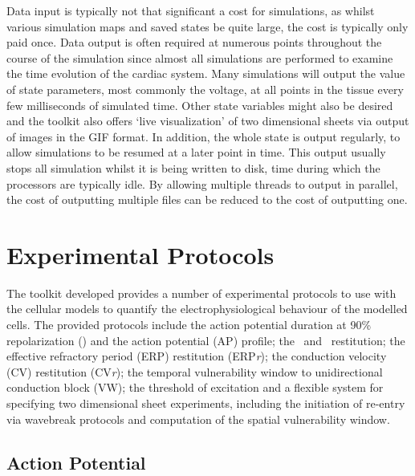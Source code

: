 Data input is typically not that significant a cost for
simulations, as whilst various simulation maps and saved states be quite large,
the cost is typically only paid once.  Data output is often required at numerous
points throughout the course of the simulation since almost all simulations are
performed to examine the time evolution of the cardiac system.  Many simulations
will output the value of state parameters, most commonly the voltage, at all
points in the tissue every few milliseconds of simulated time.  Other state
variables might also be desired and the toolkit also offers `live visualization'
of two dimensional sheets via output of images in the GIF format.  In addition,
the whole state is output regularly, to allow simulations to be resumed at a
later point in time.  This output usually stops all simulation whilst it is
being written to disk, time during which the processors are typically idle.  By
allowing multiple threads to output in parallel, the cost of outputting multiple
files can be reduced to the cost of outputting one.


\section{Experimental Protocols}
\label{sec:toolkit:protocols}

The toolkit developed provides a number of experimental protocols to use with
the cellular models to quantify the electrophysiological behaviour of the
modelled cells.  The provided protocols include the action potential duration at
90\% repolarization (\apd) and the action potential (AP) profile; the \apdr\ and
\apdr[50]\ restitution; the effective refractory period (ERP) restitution
(ERP\emph{r}); the conduction velocity (CV) restitution (CV\emph{r}); the
temporal vulnerability window to unidirectional conduction block (VW); the
threshold of excitation and a flexible system for specifying two dimensional
sheet experiments, including the initiation of re-entry via wavebreak protocols
and computation of the spatial vulnerability window.

\subsection{Action Potential}

